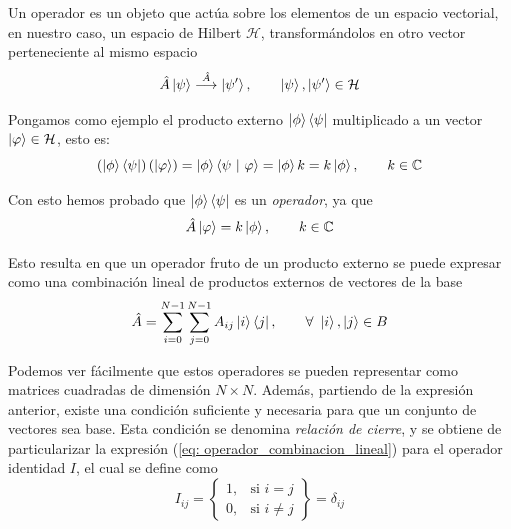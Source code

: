 \documentclass{article}
\numberwithin{equation}{section} %
\begin{document}
    \vspace{5mm}

    Un operador es un objeto que actúa sobre los elementos de un espacio vectorial, en nuestro caso, un espacio de Hilbert \( \mathcal{H} \), transformándolos en otro vector perteneciente al mismo espacio
    \begin{equation*}
        \hat{A} \ket{\psi} \overset{\hat{A}}{\longrightarrow} \ket{\psi '}, \qquad \ket{\psi}, \ket{\psi '} \in \mathcal{H}
    \end{equation*}

    \vspace{1.5mm}

    Pongamos como ejemplo el producto externo \( \ket{\phi} \bra{\psi} \) multiplicado a un vector \( \ket{\varphi} \in \mathcal{H} \), esto es:
    \begin{equation*}
        \left( \ket{\phi} \bra{\psi} \right) \left( \ket{\varphi} \right) = \ket{\phi} \braket{\psi \ | \ \varphi} = \ket{\phi} k = k \ket{\phi}, \qquad k \in \mathbb{C}
    \end{equation*}

    \vspace{1.5mm}

    Con esto hemos probado que \( \ket{\phi} \bra{\psi} \) es un \textit{operador}, ya que 
    \begin{equation}
        \hat{A} \ket\varphi = k \ket{\phi}, \qquad k \in \mathbb{C}
    \end{equation}

    \vspace{1.5mm}

    Esto resulta en que un operador fruto de un producto externo se puede expresar como una combinación lineal de productos externos de vectores de la base
    \begin{equation}
        \hat{A} = \sum_{i = 0}^{N - 1} \sum_{j = 0}^{N - 1} A_{ij} \ket{i} \bra{j}, \qquad \forall \ \ket{i}, \ket{j} \in B
        \label{eq: operador_combinacion_lineal}
    \end{equation}

    \vspace{1.5mm}

    Podemos ver fácilmente que estos operadores se pueden representar como matrices cuadradas de dimensión \( N \times N \). Además, partiendo de la expresión anterior, existe una condición suficiente y necesaria para que un conjunto de vectores sea base. Esta condición se denomina \textit{relación de cierre}, y se obtiene de particularizar la expresión (\ref{eq: operador_combinacion_lineal}) para el operador identidad \( I \), el cual se define como 
    \begin{equation}
        I_{ij} =
        \left\{
        \begin{array}{ll}
            1, & \text{si } i = j \\
            0, & \text{si } i \neq j
        \end{array}
        \right\}
        = \delta_{ij}
    \end{equation}
\end{document}
